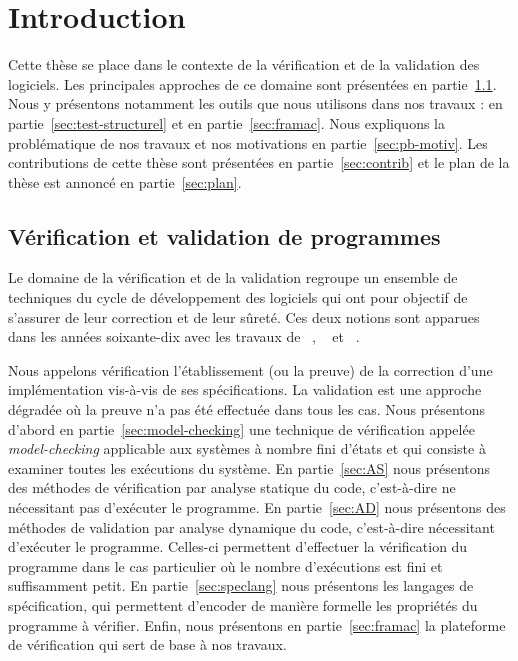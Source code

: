 
\chapter{Introduction}
\label{sec:intro}


\chapterintro


Cette thèse se place dans le contexte de la vérification et de la validation des
logiciels.
Les principales approches de ce domaine sont présentées en partie~\ref{sec:vv}.
Nous y présentons notamment les outils que nous utilisons dans nos travaux :
\pathcrawler en partie~\ref{sec:test-structurel} et \framac en
partie~\ref{sec:framac}.
Nous expliquons la problématique de nos travaux et nos motivations en
partie~\ref{sec:pb-motiv}.
Les contributions de cette thèse sont présentées en partie~\ref{sec:contrib} et
le plan de la thèse est annoncé en partie~\ref{sec:plan}.


\section{Vérification et validation de programmes}
\label{sec:vv}


Le domaine de la vérification et de la validation regroupe un ensemble de
techniques du cycle de développement des logiciels qui ont pour objectif de
s'assurer de leur correction et de leur sûreté.
Ces deux notions sont apparues dans les années soixante-dix avec les travaux de
~\cite{Dijkstra/75}, ~\cite{Floyd/63} et
~\cite{Hoare/69}.

Nous appelons vérification l'établissement (ou la preuve) de la correction d'une
implémentation vis-à-vis de ses spécifications.
La validation est une approche dégradée où la preuve n'a pas été effectuée dans
tous les cas.
Nous présentons d'abord en partie~\ref{sec:model-checking} une technique de
vérification appelée {\em model-checking} applicable aux systèmes à nombre fini
d'états et qui consiste à examiner toutes les exécutions du système.
En partie~\ref{sec:AS} nous présentons des méthodes de vérification par
analyse statique du code, c'est-à-dire ne nécessitant pas d'exécuter le
programme.
En partie~\ref{sec:AD} nous présentons des méthodes de validation par analyse
dynamique du code, c'est-à-dire nécessitant d'exécuter le programme.
Celles-ci permettent d'effectuer la vérification du programme dans le cas
particulier où le nombre d'exécutions est fini et suffisamment petit.
En partie~\ref{sec:speclang} nous présentons les langages de spécification, qui
permettent d'encoder de manière formelle les propriétés du programme à vérifier.
Enfin, nous présentons en partie~\ref{sec:framac} la plateforme de vérification
\framac qui sert de base à nos travaux.


